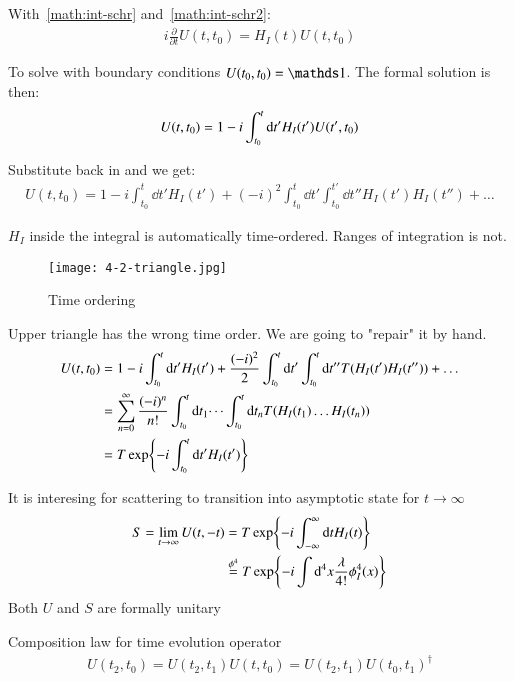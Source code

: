 With~\ref{math:int-schr} and~\ref{math:int-schr2}:
\begin{align}
	i\frac{\partial}{\partial t} U(t,t_0) = H_I(t)U(t,t_0)
\end{align}

To solve with boundary conditions $U(t_0, t_0) = \id$. The formal solution is then:
\begin{align}
	U(t,t_0) = 1 - i \int_{t_0}^t \dd t' H_I(t')U(t',t_0) \notag
\end{align}

Substitute back in and we get:
\begin{align*}
	U(t,t_0) = 1- i \int_{t_0}^t \dd t' H_I(t') + (-i)^2 \int_{t_0}^t \dd t' \int^{t'}_{t_0} \dd t'' H_I(t') H_I(t'') + \dots
\end{align*}

$H_I$ inside the integral is automatically time-ordered. Ranges of integration is not. 

\begin{figure}[ht]
	\centering
	\texttt{[image: 4-2-triangle.jpg]}
	\caption{Time ordering}
	\label{fig:4-2-triangle}
\end{figure}

Upper triangle has the wrong time order. We are going to "repair" it by hand.
\begin{align}
	U(t,t_0) &= 1-i\int_{t_0}^t \dd t' H_I(t') + \frac{(-i)^2}{2} \int_{t_0}^t \dd t' \int^{t}_{t_0} \dd t'' T(H_I(t') H_I(t'')) + \dots \notag\\
			 &= \sum_{n=0}^{\infty} \frac{(-i)^n}{n!}\int_{t_0}^t \dd t_1 \dots \int_{t_0}^t \dd t_n T(H_I(t_1) \dots H_I(t_n))  \notag\\
			 &= T \exp{-i\int_{t_0}^t \dd t' H_I(t') }
\end{align}

It is interesing for scattering to transition into asymptotic state for $t \rightarrow \infty$
\begin{align}
	S = \lim_{t \rightarrow \infty} U(t,-t) &= T \exp{-i \int_{-\infty}^\infty \dd t H_I(t)} \\
	 &\stackrel{\phi^4}{=} T \exp{-i\int \dd^4 x \frac{\lambda}{4!} \phi_I^4(x)} \notag
\end{align}
Both $U$ and $S$ are formally unitary

Composition law for time evolution operator
\begin{align}
	U(t_2, t_0) = U(t_2, t_1) U(t,t_0) = U(t_2, t_1) U(t_0, t_1)^\dagger
\end{align}

